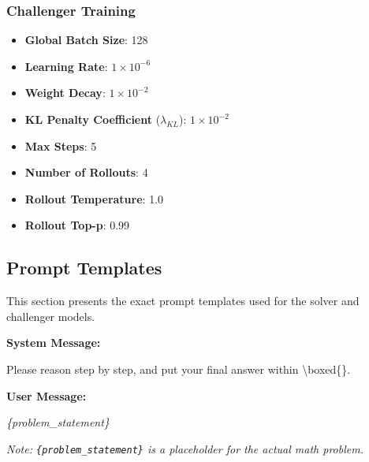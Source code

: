 \subsubsection{Challenger Training}
\begin{itemize}
    \item \textbf{Global Batch Size}: 128
    \item \textbf{Learning Rate}: $1 \times 10^{-6}$
    \item \textbf{Weight Decay}: $1 \times 10^{-2}$
    \item \textbf{KL Penalty Coefficient} ($\lambda_{KL}$): $1 \times 10^{-2}$
    \item \textbf{Max Steps}: 5
    \item \textbf{Number of Rollouts}: 4
    \item \textbf{Rollout Temperature}: 1.0
    \item \textbf{Rollout Top-p}: 0.99
\end{itemize}
\subsection{Prompt Templates}
This section presents the exact prompt templates used for the solver and challenger models.

\begin{tcolorbox}[
  colback=blue!5!white,
  colframe=blue!75!black,
  title=\textbf{Solver Prompt Template},
  fonttitle=\bfseries,
  sharp corners
]
\textbf{System Message:}
\par %
Please reason step by step, and put your final answer within \textbackslash boxed\{\}.

\textbf{User Message:}
\par
\textit{\{problem\_statement\}}
\par
\vspace{0.5em}
\textit{Note: \texttt{\{problem\_statement\}} is a placeholder for the actual math problem.}
\end{tcolorbox}

\vspace{1em} %

